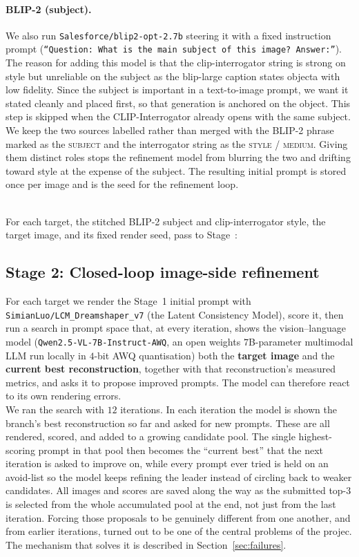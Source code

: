 \documentclass[runningheads]{llncs}
\begin{document}
\paragraph{\normalfont\textbf{BLIP-2 (subject).}} We also run \texttt{Salesforce/blip2-opt-2.7b} steering it with a fixed instruction prompt (\texttt{``Question: What is the main subject of this image? Answer:''}). The reason for adding this model is that the clip-interrogator string is strong on style but unreliable on the subject as the blip-large caption states objecta with low fidelity. Since the subject is important in a text-to-image prompt, we want it stated cleanly and placed first, so that generation is anchored on the object. This step is skipped when the CLIP-Interrogator already opens with the same subject. We keep the two sources labelled rather than merged with the BLIP-2 phrase marked as the \textsc{subject} and the interrogator string as the \textsc{style / medium}. Giving them distinct roles stops the refinement model from blurring the two and drifting toward style at the expense of the subject. The resulting initial prompt is stored once per image and is the seed for the refinement loop.

\noindent
\\
For each target, the stitched BLIP-2 subject and clip-interrogator style, the target image, and its fixed render seed, pass to Stage~:

\subsection{Stage 2: Closed-loop image-side refinement}
\label{sec:stage2}
 
For each target we render the Stage~1 initial prompt with \texttt{SimianLuo/LCM\_Dreamshaper\_v7} (the Latent Consistency Model), score it, then run a search in prompt space that, at every iteration, shows the vision–language model (\texttt{Qwen2.5-VL-7B-Instruct-AWQ}, an open weights $7$B-parameter multimodal LLM run locally in $4$-bit AWQ quantisation) both the \textbf{target image} and the \textbf{current best reconstruction}, together with that reconstruction's measured metrics, and asks it to propose improved prompts. The model can therefore react to its own rendering errors.
\noindent
\\
We ran the search with $12$ iterations. In each iteration the model is shown the branch's best reconstruction so far and asked for new prompts. These are all rendered, scored, and added to a growing candidate pool. The single highest-scoring prompt in that pool then becomes the ``current best'' that the next iteration is asked to improve on, while every prompt ever tried is held on an avoid-list so the model keeps refining the leader instead of circling back to weaker candidates. All images and scores are saved along the way as the submitted top-3 is selected from the whole accumulated pool at the end, not just from the last iteration. Forcing those proposals to be genuinely different from one another, and from earlier iterations, turned out to be one of the central problems of the projec. The mechanism that solves it is described in Section~\ref{sec:failures}.
\end{document}

